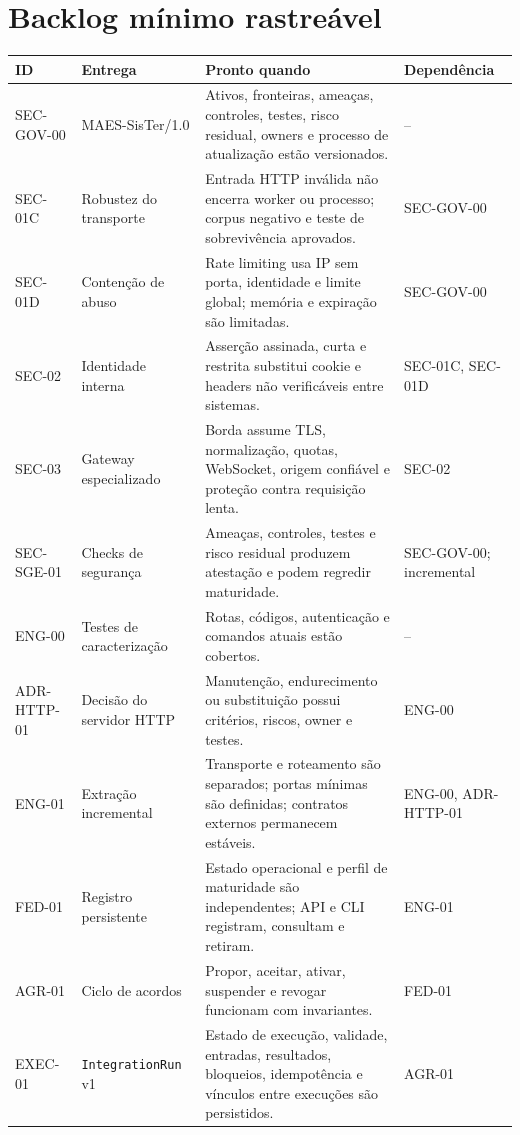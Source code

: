 \documentclass[11pt,a4paper,oneside]{article}
\begin{document}
\section{Backlog mínimo rastreável}
\begin{longtable}{P{1.5cm}P{3.6cm}P{5.7cm}P{2.7cm}}
\toprule
\textbf{ID} & \textbf{Entrega} & \textbf{Pronto quando} & \textbf{Dependência} \\
\midrule
\endhead
SEC-GOV-00 & MAES-SisTer/1.0 & Ativos, fronteiras, ameaças, controles, testes, risco residual, owners e processo de atualização estão versionados. & -- \\
SEC-01C & Robustez do transporte & Entrada HTTP inválida não encerra worker ou processo; corpus negativo e teste de sobrevivência aprovados. & SEC-GOV-00 \\
SEC-01D & Contenção de abuso & Rate limiting usa IP sem porta, identidade e limite global; memória e expiração são limitadas. & SEC-GOV-00 \\
SEC-02 & Identidade interna & Asserção assinada, curta e restrita substitui cookie e headers não verificáveis entre sistemas. & SEC-01C, SEC-01D \\
SEC-03 & Gateway especializado & Borda assume TLS, normalização, quotas, WebSocket, origem confiável e proteção contra requisição lenta. & SEC-02 \\
SEC-SGE-01 & Checks de segurança & Ameaças, controles, testes e risco residual produzem atestação e podem regredir maturidade. & SEC-GOV-00; incremental \\
ENG-00 & Testes de caracterização & Rotas, códigos, autenticação e comandos atuais estão cobertos. & -- \\
ADR-HTTP-01 & Decisão do servidor HTTP & Manutenção, endurecimento ou substituição possui critérios, riscos, owner e testes. & ENG-00 \\
ENG-01 & Extração incremental & Transporte e roteamento são separados; portas mínimas são definidas; contratos externos permanecem estáveis. & ENG-00, ADR-HTTP-01 \\
FED-01 & Registro persistente & Estado operacional e perfil de maturidade são independentes; API e CLI registram, consultam e retiram. & ENG-01 \\
AGR-01 & Ciclo de acordos & Propor, aceitar, ativar, suspender e revogar funcionam com invariantes. & FED-01 \\
EXEC-01 & \texttt{IntegrationRun} v1 & Estado de execução, validade, entradas, resultados, bloqueios, idempotência e vínculos entre execuções são persistidos. & AGR-01 \\

\end{longtable}
\end{document}
